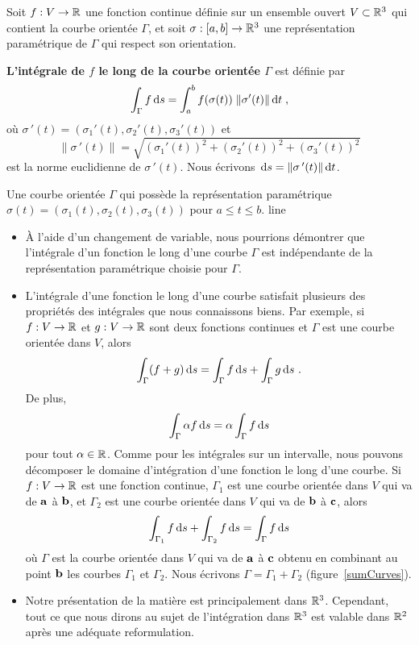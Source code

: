 {\begin{defn}
Soit $f:V \rightarrow \mathbb{R}$ une fonction continue définie 
sur un ensemble ouvert $V \subset \mathbb{R}^3$ qui contient la courbe
orientée $\Gamma$, et soit $\sigma:[a,b]\to \mathbb{R}^3$ une représentation
paramétrique de $\Gamma$ qui respect son orientation.

{\bfseries L'intégrale de $f$ le long de la courbe orientée $\Gamma$}
est définie par
\[
\int_\Gamma f \,\mathrm{d}s = \int_a^b f(\sigma(t)) \; \| \sigma'(t) \| \,\mathrm{d}t \;,
\]
où $\sigma\,'(t) = (\sigma_1'(t),\sigma_2'(t),\sigma_3'(t))$ et
\[
\| \sigma\,'(t) \| = \sqrt{(\sigma_1'(t))^2+(\sigma_2'(t))^2+(\sigma_3'(t))^2}
\]
est la norme euclidienne de $\sigma\,'(t)$.
Nous écrivons $\,\mathrm{d}s = \|\sigma\,'(t)\| \,\mathrm{d}t$.
\end{defn}

{Une courbe orientée $\Gamma$ qui possède la représentation paramétrique
$\sigma(t) = (\sigma_1(t), \sigma_2(t), \sigma_3(t))$ pour $a\leq t \leq b$.}
{line}

\begin{rmkList}
\begin{itemize}
\item À l'aide d'un changement de variable, nous pourrions démontrer que
l'intégrale d'un fonction le long d'une courbe $\Gamma$ est
indépendante de la représentation paramétrique choisie pour $\Gamma$.
\item L'intégrale d'une fonction le long d'une courbe satisfait
plusieurs des propriétés des intégrales que nous connaissons biens.
Par exemple, si $f:V\to \mathbb{R}$ et $g:V\to \mathbb{R}$ sont deux fonctions
continues et $\Gamma$ est une courbe orientée dans $V$, alors
\[
\int_\Gamma (f+g) \,\mathrm{d}s = \int_\Gamma f \,\mathrm{d}s + \int_\Gamma g \,\mathrm{d}s
\ .
\]
De plus,
\[
\int_\Gamma \alpha f \,\mathrm{d}s = \alpha \int_\Gamma f \,\mathrm{d}s
\]
pour tout $\alpha \in \mathbb{R}$.  Comme pour les intégrales sur un
intervalle, nous pouvons décomposer le domaine d'intégration d'une
fonction le long d'une courbe.   Si $f:V\to \mathbb{R}$ est une fonction
continue, $\Gamma_1$ est une courbe orientée dans $V$ qui va de
$\mathbf{a}$ à $\mathbf{b}$, et $\Gamma_2$ est une courbe orientée dans $V$
qui va de $\mathbf{b}$ à $\mathbf{c}$, alors
\[
  \int_{\Gamma_1} f \,\mathrm{d}s + \int_{\Gamma_2} f\,\mathrm{d}s
  = \int_\Gamma f \,\mathrm{d}s
\]
où $\Gamma$ est la courbe orientée dans $V$ qui va de $\mathbf{a}$ à
$\mathbf{c}$ obtenu en combinant au point $\mathbf{b}$ les courbes $\Gamma_1$ et
$\Gamma_2$.  Nous écrivons $\Gamma = \Gamma_1 + \Gamma_2$
(figure~\ref{sumCurves}).
\item Notre présentation de la matière est principalement dans
$\mathbb{R}^3$.  Cependant, tout ce que nous dirons au sujet de l'intégration
dans $\mathbb{R}^3$ est valable dans $\mathbb{R}^2$ après une adéquate
reformulation.
\end{itemize}
\end{rmkList}

}
